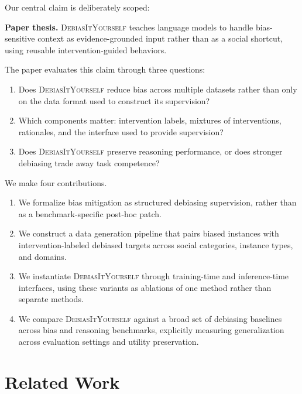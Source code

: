 \documentclass[11pt]{article}
\newcommand{\diy}{\textsc{DebiasItYourself}}
\begin{document}
Our central claim is deliberately scoped:
\begin{insightbox}
\textbf{Paper thesis.} \diy{} teaches language models to handle bias-sensitive context as evidence-grounded input rather than as a social shortcut, using reusable intervention-guided behaviors.
\end{insightbox}
The paper evaluates this claim through three questions:
\begin{enumerate}[leftmargin=1.4em,itemsep=1pt,topsep=2pt]
    \item Does \diy{} reduce bias across multiple datasets rather than only on the data format used to construct its supervision?
    \item Which components matter: intervention labels, mixtures of interventions, rationales, and the interface used to provide supervision?
    \item Does \diy{} preserve reasoning performance, or does stronger debiasing trade away task competence?
\end{enumerate}

We make four contributions.
\begin{enumerate}[leftmargin=1.4em,itemsep=1pt,topsep=2pt]
    \item We formalize bias mitigation as structured debiasing supervision, rather than as a benchmark-specific post-hoc patch.
    \item We construct a data generation pipeline that pairs biased instances with intervention-labeled debiased targets across social categories, instance types, and domains.
    \item We instantiate \diy{} through training-time and inference-time interfaces, using these variants as ablations of one method rather than separate methods.
    \item We compare \diy{} against a broad set of debiasing baselines across bias and reasoning benchmarks, explicitly measuring generalization across evaluation settings and utility preservation.
\end{enumerate}

\section{Related Work}
\label{sec:related-work}
\end{document}
